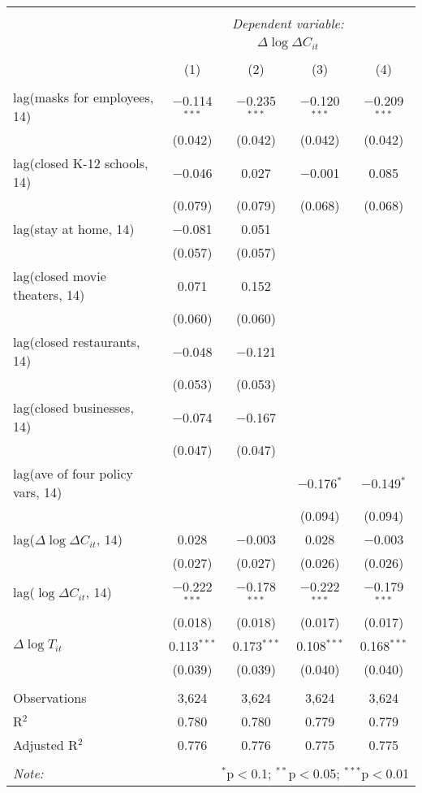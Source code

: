 \begin{tabular}{@{\extracolsep{1pt}}lcccc} 
\\[-1.8ex]\hline 
\hline \\[-1.8ex] 
 & \multicolumn{4}{c}{\textit{Dependent variable:}} \\ 
\cline{2-5} 
 & \multicolumn{4}{c}{$\Delta \log \Delta C_{it}$} \\ 
\\[-1.8ex] & (1) & (2) & (3) & (4)\\ 
\hline \\[-1.8ex] 
 lag(masks for employees, 14) & $-$0.114$^{***}$ & $-$0.235$^{***}$ & $-$0.120$^{***}$ & $-$0.209$^{***}$ \\ 
  & (0.042) & (0.042) & (0.042) & (0.042) \\ 
  lag(closed K-12 schools, 14) & $-$0.046 & 0.027 & $-$0.001 & 0.085 \\ 
  & (0.079) & (0.079) & (0.068) & (0.068) \\ 
  lag(stay at home, 14) & $-$0.081 & 0.051 &  &  \\ 
  & (0.057) & (0.057) &  &  \\ 
  lag(closed movie theaters, 14) & 0.071 & 0.152 &  &  \\ 
  & (0.060) & (0.060) &  &  \\ 
  lag(closed restaurants, 14) & $-$0.048 & $-$0.121 &  &  \\ 
  & (0.053) & (0.053) &  &  \\ 
  lag(closed businesses, 14) & $-$0.074 & $-$0.167 &  &  \\ 
  & (0.047) & (0.047) &  &  \\ 
  lag(ave of four policy vars, 14) &  &  & $-$0.176$^{*}$ & $-$0.149$^{*}$ \\ 
  &  &  & (0.094) & (0.094) \\ 
  lag($\Delta \log \Delta C_{it}$, 14) & 0.028 & $-$0.003 & 0.028 & $-$0.003 \\ 
  & (0.027) & (0.027) & (0.026) & (0.026) \\ 
  lag($\log \Delta C_{it}$, 14) & $-$0.222$^{***}$ & $-$0.178$^{***}$ & $-$0.222$^{***}$ & $-$0.179$^{***}$ \\ 
  & (0.018) & (0.018) & (0.017) & (0.017) \\ 
  $\Delta \log T_{it}$ & 0.113$^{***}$ & 0.173$^{***}$ & 0.108$^{***}$ & 0.168$^{***}$ \\ 
  & (0.039) & (0.039) & (0.040) & (0.040) \\ 
 \hline \\[-1.8ex] 
Observations & 3,624 & 3,624 & 3,624 & 3,624 \\ 
R$^{2}$ & 0.780 & 0.780 & 0.779 & 0.779 \\ 
Adjusted R$^{2}$ & 0.776 & 0.776 & 0.775 & 0.775 \\ 
\hline 
\hline \\[-1.8ex] 
\textit{Note:}  & \multicolumn{4}{r}{$^{*}$p$<$0.1; $^{**}$p$<$0.05; $^{***}$p$<$0.01} \\ 
\end{tabular} 